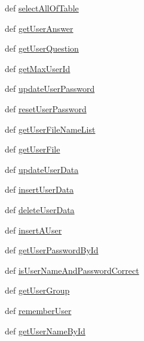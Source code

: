 \begin{DoxyCompactItemize}
def \hyperlink{classweb_1_1database_1_1_sqlite_database_a59c2f0066ddcba177323be526314c9da}{select\-All\-Of\-Table}
\item 
def \hyperlink{classweb_1_1database_1_1_sqlite_database_af1a50470e43bc733dd685aada07e3617}{get\-User\-Answer}
\item 
def \hyperlink{classweb_1_1database_1_1_sqlite_database_af4e44375ecc4008b039313fb7c341821}{get\-User\-Question}
\item 
def \hyperlink{classweb_1_1database_1_1_sqlite_database_aa62f2c3a69e55372b9a66ed332f58e9d}{get\-Max\-User\-Id}
\item 
def \hyperlink{classweb_1_1database_1_1_sqlite_database_a1b89378d2c5141202b86026d9e9b3738}{update\-User\-Password}
\item 
def \hyperlink{classweb_1_1database_1_1_sqlite_database_ad582b58beb1e6885b24d5c518ed3e436}{reset\-User\-Password}
\item 
def \hyperlink{classweb_1_1database_1_1_sqlite_database_ae235843baa6fead6fdb7f303c4de55ad}{get\-User\-File\-Name\-List}
\item 
def \hyperlink{classweb_1_1database_1_1_sqlite_database_af02720856f577729f2770602fb30c5d6}{get\-User\-File}
\item 
def \hyperlink{classweb_1_1database_1_1_sqlite_database_a061db60fe272d6d9ee3a5d4eecbe0937}{update\-User\-Data}
\item 
def \hyperlink{classweb_1_1database_1_1_sqlite_database_a4838ce43eed7fc1ef470316c6e0f81c2}{insert\-User\-Data}
\item 
def \hyperlink{classweb_1_1database_1_1_sqlite_database_a599f04479dffcc7902db402e48529848}{delete\-User\-Data}
\item 
def \hyperlink{classweb_1_1database_1_1_sqlite_database_ae42c9a5dee3bff132e5f8f2458e8ac48}{insert\-A\-User}
\item 
def \hyperlink{classweb_1_1database_1_1_sqlite_database_a24a81afb2a52bfd4d44ed5d7f864f74c}{get\-User\-Password\-By\-Id}
\item 
def \hyperlink{classweb_1_1database_1_1_sqlite_database_ab34aa657485cc920ea156d9e7bb913a8}{is\-User\-Name\-And\-Password\-Correct}
\item 
def \hyperlink{classweb_1_1database_1_1_sqlite_database_ac9dddfa269a4ea8777ff824594b4bebc}{get\-User\-Group}
\item 
def \hyperlink{classweb_1_1database_1_1_sqlite_database_a727f95db54db2006a3be8b078e5df8d9}{remember\-User}
\item 
def \hyperlink{classweb_1_1database_1_1_sqlite_database_aefda2b881d0c6370530b23a1f715d363}{get\-User\-Name\-By\-Id}

\end{DoxyCompactItemize}

